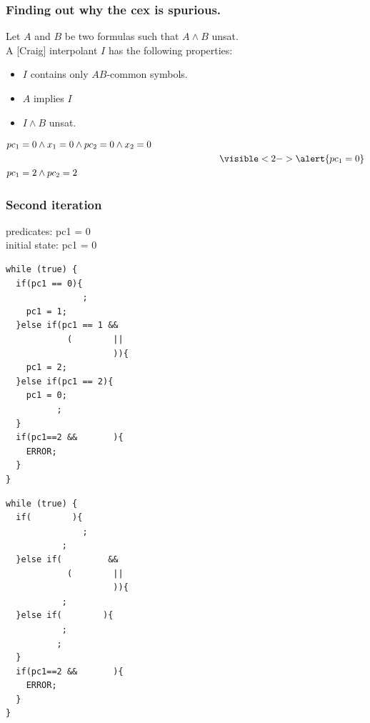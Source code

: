 \documentclass{beamer}
\begin{document}
\begin{frame}
  \frametitle{Finding out why the cex is spurious.}

  Let $A$ and $B$ be two formulas such that
  $A \wedge B$ unsat.\\
  A [Craig] interpolant $I$ has the following properties:
  \begin{itemize}
  \item $I$ contains only $AB$-common symbols.
  \item $A$ implies $I$
  \item $I \wedge B$ unsat.
  \end{itemize}

\begin{align*}
& pc_1=0 \land x_1=0 \land pc_2=0 \land x_2=0 \\
& \hspace{8cm} \visible<2->{\alert{pc_1 = 0}}\\
& pc_1=2 \land pc_2=2
\end{align*}
\end{frame}

\begin{frame}[fragile]
  \frametitle{Second iteration}

{\footnotesize
predicates: pc1 = 0\\
initial state: pc1 = 0
}
\vfill
\begin{minipage}{0.45\linewidth}
\begin{lstlisting}
while (true) {
  if(pc1 == 0){
               ;
    pc1 = 1;
  }else if(pc1 == 1 &&
            (        ||
                     )){
    pc1 = 2;
  }else if(pc1 == 2){
    pc1 = 0;
          ;
  }
  if(pc1==2 &&       ){
    ERROR;
  }
}
\end{lstlisting}
\end{minipage}
\hfill
\begin{minipage}{0.45\linewidth}
\begin{lstlisting}
while (true) {
  if(        ){
               ;
           ;
  }else if(         &&
            (        ||
                     )){
           ;
  }else if(        ){
           ;
          ;
  }
  if(pc1==2 &&       ){
    ERROR;
  }
}
\end{lstlisting}
\end{minipage}

\end{frame}
\end{document}

